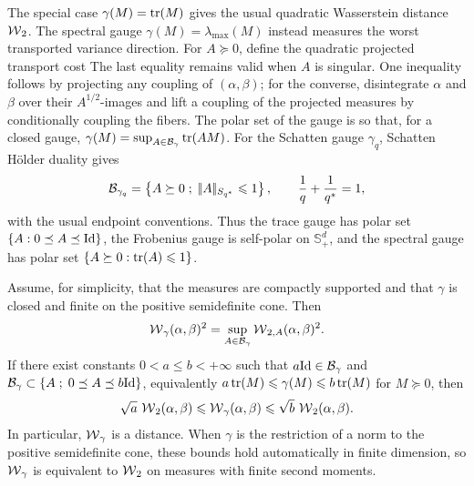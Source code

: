 The special case $\gamma(M)=\operatorname{tr}(M)$ gives the usual quadratic Wasserstein distance $\operatorname{\mathcal{W}}_2$. The spectral gauge $\gamma(M)=\lambda_{\max}(M)$ instead measures the worst transported variance direction. For $A\succeq0$, define the quadratic projected transport cost
The last equality remains valid when $A$ is singular. One inequality follows by projecting any coupling of $(\alpha,\beta)$; for the converse, disintegrate $\alpha$ and $\beta$ over their $A^{1/2}$-images and lift a coupling of the projected measures by conditionally coupling the fibers.
The polar set of the gauge is
so that, for a closed gauge, $\gamma(M)=\sup_{A\in\mathcal B_\gamma}\operatorname{tr}(AM)$. For the Schatten gauge $\gamma_q$, Schatten H\"older duality gives
\[
	\mathcal B_{\gamma_q}
	=
	\left\{ A\succeq0 \;;\; |\!| A |\!|_{S_{q^\ast}}\leqslant1 \right\},
	\qquad
	\frac1q+\frac1{q^\ast}=1,
\]
with the usual endpoint conventions. Thus the trace gauge has polar set $\{A:0\preceq A\preceq\mathrm{Id}\}$, the Frobenius gauge is self-polar on $\mathbb S_+^d$, and the spectral gauge has polar set $\{A\succeq0:\operatorname{tr}(A)\leqslant1\}$.

\begin{prop}\label{prop-spectral-wasserstein-robust}
	Assume, for simplicity, that the measures are compactly supported and that $\gamma$ is closed and finite on the positive semidefinite cone. Then
	\[
		\operatorname{\mathcal{W}}_\gamma(\alpha,\beta)^2
		=
		\sup_{A\in\mathcal B_\gamma}
		\operatorname{\mathcal{W}}_{2,A}(\alpha,\beta)^2.
	\]
	If there exist constants $0<a\leq b<+\infty$ such that $a\mathrm{Id}\in\mathcal B_\gamma$ and $\mathcal B_\gamma\subset\left\{ A \;;\; 0\preceq A\preceq b\mathrm{Id} \right\}$, equivalently
	$a\operatorname{tr}(M)\leqslant\gamma(M)\leqslant b\operatorname{tr}(M)$ for $M\succeq0$,
	then
	\[
		\sqrt a\,\operatorname{\mathcal{W}}_2(\alpha,\beta)
		\leqslant
		\operatorname{\mathcal{W}}_\gamma(\alpha,\beta)
		\leqslant
		\sqrt b\,\operatorname{\mathcal{W}}_2(\alpha,\beta).
	\]
	In particular, $\operatorname{\mathcal{W}}_\gamma$ is a distance. When $\gamma$ is the restriction of a norm to the positive semidefinite cone, these bounds hold automatically in finite dimension, so $\operatorname{\mathcal{W}}_\gamma$ is equivalent to $\operatorname{\mathcal{W}}_2$ on measures with finite second moments.
\end{prop}

